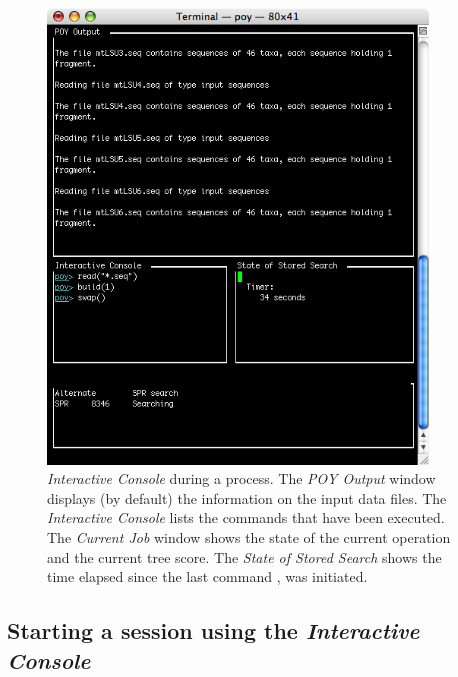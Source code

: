 {\begin{figure}[htbp]
\centering
\includegraphics[width=0.9\textwidth]{doc/figures/figprocess.jpg}
\caption{\poy \emph{Interactive Console} during a process. The \emph{POY Output} 
window displays (by default) the information on the input data files. The 
\emph{Interactive Console} lists the commands that have been executed. The 
\emph{Current Job} window shows the state of the current operation and the 
current tree score. The \emph{State of Stored Search} shows the time elapsed  
since the last command , was initiated.}
\label{fig:figprocess}
\end{figure}

\subsection{Starting a \poy session using the \emph{Interactive Console}}

}
